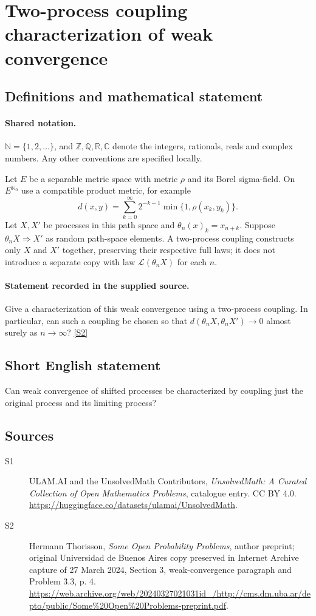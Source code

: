 \documentclass[11pt]{article}
\newcommand{\sref}[2]{\hyperlink{source:#1:#2}{[S#2]}}
\begin{document}
\section{Two-process coupling characterization of weak convergence}\label{statement}

\subsection{Definitions and mathematical statement}

\paragraph{Shared notation.}$\mathbb N=\{1,2,\ldots\}$, and $\mathbb Z,\mathbb Q,\mathbb R,\mathbb C$ denote the integers, rationals, reals and complex numbers. Any other conventions are specified locally.


Let $E$ be a separable metric space with metric $\rho$ and its Borel sigma-field. On $E^{\mathbb N_0}$ use a compatible product metric, for example
\[d(x,y)=\sum_{k=0}^\infty2^{-k-1}\min\{1,\rho(x_k,y_k)\}.\]
Let $X,X'$ be processes in this path space and $\theta_n(x)_k=x_{n+k}$. Suppose $\theta_nX\Rightarrow X'$ as random path-space elements. A two-process coupling constructs only $X$ and $X'$ together, preserving their respective full laws; it does not introduce a separate copy with law $\mathcal L(\theta_nX)$ for each $n$.
\paragraph{Statement recorded in the supplied source.}
Give a characterization of this weak convergence using a two-process coupling. In particular, can such a coupling be chosen so that $d(\theta_nX,\theta_nX')\to0$ almost surely as $n\to\infty$? \sref{statement}{2}
\subsection{Short English statement}
Can weak convergence of shifted processes be characterized by coupling just the original process and its limiting process?
\subsection{Sources}
\begin{description}
\item[\hypertarget{source:statement:1}{S1}] ULAM.AI and the UnsolvedMath Contributors, \emph{UnsolvedMath: A Curated Collection of Open Mathematics Problems}, catalogue entry. CC BY 4.0. \url{https://huggingface.co/datasets/ulamai/UnsolvedMath}.
\item[\hypertarget{source:statement:2}{S2}] Hermann Thorisson, \emph{Some Open Probability Problems}, author preprint; original Universidad de Buenos Aires copy preserved in Internet Archive capture of 27 March 2024, Section 3, weak-convergence paragraph and Problem 3.3, p. 4. \url{https://web.archive.org/web/20240327021031id_/http://cms.dm.uba.ar/depto/public/Some%20Open%20Problems-preprint.pdf}.
\end{description}
\label{end:statement}
\end{document}
